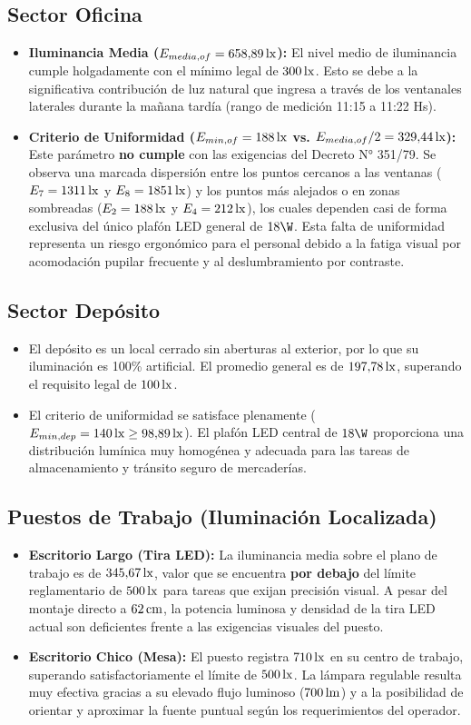 \subsection{Sector Oficina}
\begin{itemize}
    \item \textbf{Iluminancia Media ($E_{media,of} = 658{,}89\,\mathrm{lx}$):} El nivel medio de iluminancia cumple holgadamente con el mínimo legal de $300\,\mathrm{lx}$. Esto se debe a la significativa contribución de luz natural que ingresa a través de los ventanales laterales durante la mañana tardía (rango de medición 11:15 a 11:22 Hs).
    \item \textbf{Criterio de Uniformidad ($E_{min,of} = 188\,\mathrm{lx}$ vs. $E_{media,of}/2 = 329{,}44\,\mathrm{lx}$):} Este parámetro \textbf{no cumple} con las exigencias del Decreto N° 351/79. Se observa una marcada dispersión entre los puntos cercanos a las ventanas ($E_7 = 1311\,\mathrm{lx}$ y $E_8 = 1851\,\mathrm{lx}$) y los puntos más alejados o en zonas sombreadas ($E_2 = 188\,\mathrm{lx}$ y $E_4 = 212\,\mathrm{lx}$), los cuales dependen casi de forma exclusiva del único plafón LED general de $18\W$. Esta falta de uniformidad representa un riesgo ergonómico para el personal debido a la fatiga visual por acomodación pupilar frecuente y al deslumbramiento por contraste.
\end{itemize}

\subsection{Sector Depósito}
\begin{itemize}
    \item El depósito es un local cerrado sin aberturas al exterior, por lo que su iluminación es 100\% artificial. El promedio general es de $197{,}78\,\mathrm{lx}$, superando el requisito legal de $100\,\mathrm{lx}$. 
    \item El criterio de uniformidad se satisface plenamente ($E_{min,dep} = 140\,\mathrm{lx} \ge 98{,}89\,\mathrm{lx}$). El plafón LED central de $18\W$ proporciona una distribución lumínica muy homogénea y adecuada para las tareas de almacenamiento y tránsito seguro de mercaderías.
\end{itemize}

\subsection{Puestos de Trabajo (Iluminación Localizada)}
\begin{itemize}
    \item \textbf{Escritorio Largo (Tira LED):} La iluminancia media sobre el plano de trabajo es de $345{,}67\,\mathrm{lx}$, valor que se encuentra \textbf{por debajo} del límite reglamentario de $500\,\mathrm{lx}$ para tareas que exijan precisión visual. A pesar del montaje directo a $62\,\mathrm{cm}$, la potencia luminosa y densidad de la tira LED actual son deficientes frente a las exigencias visuales del puesto.
    \item \textbf{Escritorio Chico (Mesa):} El puesto registra $710\,\mathrm{lx}$ en su centro de trabajo, superando satisfactoriamente el límite de $500\,\mathrm{lx}$. La lámpara regulable resulta muy efectiva gracias a su elevado flujo luminoso ($700\,\mathrm{lm}$) y a la posibilidad de orientar y aproximar la fuente puntual según los requerimientos del operador.
\end{itemize}
